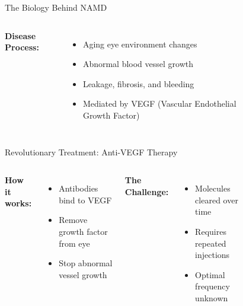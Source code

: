 \documentclass[10pt,aspectratio=169]{beamer}
\begin{document}
\begin{frame}{The Biology Behind NAMD}
\begin{columns}[T]
\textbf{Disease Process:}
\begin{itemize}
    \item Aging eye environment changes
    \item Abnormal blood vessel growth
    \item Leakage, fibrosis, and bleeding
    \item Mediated by VEGF (Vascular Endothelial Growth Factor)
\end{itemize}

\begin{figure}
    \centering
\end{figure}
\end{columns}
\end{frame}

\begin{frame}{Revolutionary Treatment: Anti-VEGF Therapy}
\begin{columns}[T]
\textbf{How it works:}
\begin{itemize}
    \item Antibodies bind to VEGF
    \item Remove growth factor from eye
    \item Stop abnormal vessel growth
\end{itemize}

\vspace{0.5cm}
\alert{\textbf{The Challenge:}}
\begin{itemize}
    \item Molecules cleared over time
    \item Requires repeated injections
    \item Optimal frequency unknown
\end{itemize}

\begin{figure}
    \centering
\end{figure}
\end{columns}
\end{frame}
\end{document}
